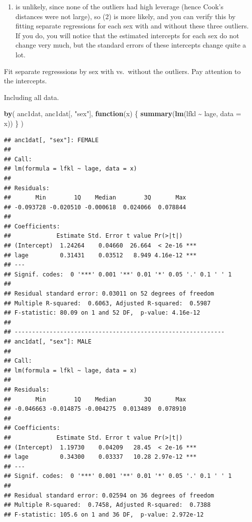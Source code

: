 \documentclass[
  12pt,
]{book}
\makeatletter
\newenvironment{Shaded}{\begin{snugshade}}{\end{snugshade}}
\newcommand{\ControlFlowTok}[1]{\textcolor[rgb]{0.13,0.29,0.53}{\textbf{#1}}}
\newcommand{\DataTypeTok}[1]{\textcolor[rgb]{0.13,0.29,0.53}{#1}}
\newcommand{\KeywordTok}[1]{\textcolor[rgb]{0.13,0.29,0.53}{\textbf{#1}}}
\newcommand{\NormalTok}[1]{#1}
\newcommand{\OperatorTok}[1]{\textcolor[rgb]{0.81,0.36,0.00}{\textbf{#1}}}
\newcommand{\StringTok}[1]{\textcolor[rgb]{0.31,0.60,0.02}{#1}}
\providecommand{\tightlist}{%
  \setlength{\itemsep}{0pt}\setlength{\parskip}{0pt}}
\newenvironment{kframe}{%
\medskip{}
\setlength{\fboxsep}{.8em}
\def\at@end@of@kframe{}%
\ifinner\ifhmode%
 \def\at@end@of@kframe{\end{minipage}}%
 \begin{minipage}{\columnwidth}%
\fi\fi%
\def\FrameCommand##1{\hskip\@totalleftmargin \hskip-\fboxsep
\colorbox{incolor}{##1}\hskip-\fboxsep
    \hskip-\linewidth \hskip-\@totalleftmargin \hskip\columnwidth}%
\MakeFramed {\advance\hsize-\width
  \@totalleftmargin\z@ \linewidth\hsize
  \@setminipage}}%
{\par\unskip\endMakeFramed%
\at@end@of@kframe}
\newenvironment{rmdblock}[1]
 {
 \begin{itemize}
 \renewcommand{\labelitemi}{
   \raisebox{-.7\height}[0pt][0pt]{
     {\setkeys{Gin}{width=3em,keepaspectratio}\texttt{[image: images/\#1]}}
   }
 }
 \begin{kframe}
 \setlength{\fboxsep}{1em}
 \item
 }
 {
 \end{kframe}
 \end{itemize}
 }
\newenvironment{rmdcode}
  {\begin{rmdblock}{screen}}
  {\end{rmdblock}}
\makeatother
\begin{document}
\begin{enumerate}
\def\labelenumi{(\arabic{enumi})}
\tightlist
\item
  is unlikely, since none of the outliers had high leverage (hence Cook's distances were not large), so (2) is more likely, and you can verify this by fitting separate regressions for each sex with and without these three outliers. If you do, you will notice that the estimated intercepts for each sex do not change very much, but the standard errors of these intercepts change quite a lot.
\end{enumerate}

\begin{rmdcode}
Fit separate regresssions by sex with vs.~without the outliers. Pay attention to the intercepts.
\end{rmdcode}

Including all data.

\begin{Shaded}
\begin{Highlighting}[]
\KeywordTok{by}\NormalTok{(}
\NormalTok{  anc1dat,}
\NormalTok{  anc1dat[, }\StringTok{"sex"}\NormalTok{],}
  \ControlFlowTok{function}\NormalTok{(x) \{}
    \KeywordTok{summary}\NormalTok{(}\KeywordTok{lm}\NormalTok{(lfkl }\OperatorTok{\textasciitilde{}}\StringTok{ }\NormalTok{lage, }\DataTypeTok{data =}\NormalTok{ x))}
\NormalTok{  \}}
\NormalTok{)}
\end{Highlighting}
\end{Shaded}

\begin{verbatim}
## anc1dat[, "sex"]: FEMALE      
## 
## Call:
## lm(formula = lfkl ~ lage, data = x)
## 
## Residuals:
##       Min        1Q    Median        3Q       Max 
## -0.093728 -0.020510 -0.000618  0.024066  0.078844 
## 
## Coefficients:
##             Estimate Std. Error t value Pr(>|t|)    
## (Intercept)  1.24264    0.04660  26.664  < 2e-16 ***
## lage         0.31431    0.03512   8.949 4.16e-12 ***
## ---
## Signif. codes:  0 '***' 0.001 '**' 0.01 '*' 0.05 '.' 0.1 ' ' 1
## 
## Residual standard error: 0.03011 on 52 degrees of freedom
## Multiple R-squared:  0.6063, Adjusted R-squared:  0.5987 
## F-statistic: 80.09 on 1 and 52 DF,  p-value: 4.16e-12
## 
## ------------------------------------------------------------ 
## anc1dat[, "sex"]: MALE        
## 
## Call:
## lm(formula = lfkl ~ lage, data = x)
## 
## Residuals:
##       Min        1Q    Median        3Q       Max 
## -0.046663 -0.014875 -0.004275  0.013489  0.078910 
## 
## Coefficients:
##             Estimate Std. Error t value Pr(>|t|)    
## (Intercept)  1.19730    0.04209   28.45  < 2e-16 ***
## lage         0.34300    0.03337   10.28 2.97e-12 ***
## ---
## Signif. codes:  0 '***' 0.001 '**' 0.01 '*' 0.05 '.' 0.1 ' ' 1
## 
## Residual standard error: 0.02594 on 36 degrees of freedom
## Multiple R-squared:  0.7458, Adjusted R-squared:  0.7388 
## F-statistic: 105.6 on 1 and 36 DF,  p-value: 2.972e-12
\end{verbatim}
\end{document}
